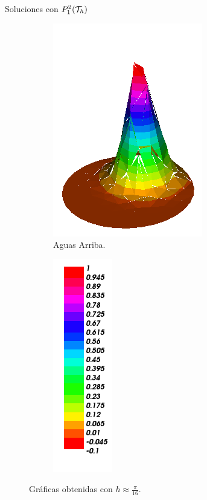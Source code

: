 \begin{frame}{Soluciones con $\relax{P}_1^2(\mathcal{T}_h)$}
\begin{figure}[h!]
\begin{subfigure}[b]{0.27\textwidth}
				\centering
				\includegraphics[scale=0.22]{img/Conveccion_Reaccion/Recortes/steady_convect_react_approx_UPW_n_32.png}
				\caption{Aguas Arriba.}
			\end{subfigure}
			\begin{subfigure}[b]{0.15\textwidth}
				\centering
				\includegraphics[scale=0.22]{img/Conveccion_Reaccion/Recortes/steady_convect_react_values.png}
			\end{subfigure}
			\caption{Gráficas obtenidas con $h\approx\frac{\pi}{16}$.}
		\end{figure}
		\vspace{-0.7cm}
		\begin{figure}[h!]
			\begin{subfigure}[b]{0.27\textwidth}
				\centering

\end{subfigure}
\end{figure}
\end{frame}
